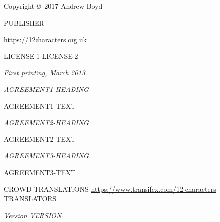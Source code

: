 \documentclass[12pt,fleqn]{book} %
\begin{document}
\afont


\begingroup
\thispagestyle{empty} %
\vfill
\endgroup

\newpage
\thispagestyle{empty}
\vspace*{\fill}
\begingroup
   \setlength\parskip{\baselineskip}
   \setlength\parindent{0pt}
   Copyright \copyright\ 2017 Andrew Boyd
 
   \textsc{PUBLISHER}
 
   \url{https://12characters.org.uk}
 
   LICENSE-1 LICENSE-2
 
   \textit{First printing, March 2013}

   \textit{AGREEMENT1-HEADING}

AGREEMENT1-TEXT

   \textit{AGREEMENT2-HEADING}

AGREEMENT2-TEXT

   \textit{AGREEMENT3-HEADING}

AGREEMENT3-TEXT

   CROWD-TRANSLATIONS \url{https://www.transifex.com/12-characters} TRANSLATORS

   \textit{Version VERSION} %

\endgroup

\end{document}
